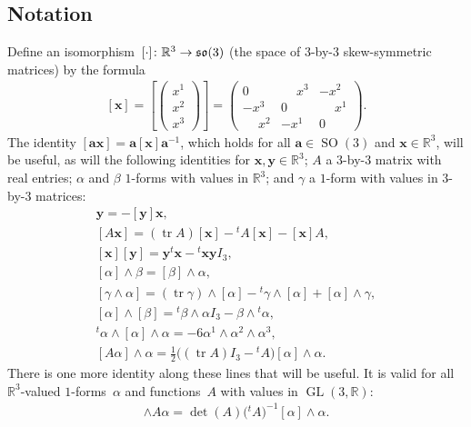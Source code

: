 \documentclass[pdftex]{sigma}
\numberwithin{equation}{section}
\newcommand{\GL}{\operatorname{GL}}
\newcommand{\SO}{\operatorname{SO}}
\newcommand{\euso}{\operatorname{\frak{so}}}
\newcommand{\mba}{\mathbf{a}}
\newcommand{\mbx}{\mathbf{x}}
\newcommand{\mby}{\mathbf{y}}
\DeclareMathOperator{\tr}{tr}
\newcommand{\phm}{\phantom{-}}
\begin{document}
\subsection{Notation}
Define an isomorphism~$[{\cdot}]\colon \mathbb{R}^3\to\euso(3)$
(the space of $3$-by-$3$ skew-symmetric matrices) by the formula
\begin{gather*}%
\left[ \mbx \right]
= \left[\begin{pmatrix}x^1\\x^2\\x^3\end{pmatrix}\right]
= \begin{pmatrix}
 0 & \phm x^3 & -x^2\\
 -x^3 & 0 & \phm x^1\\
 \phm x^2 & -x^1 & 0
 \end{pmatrix}.
\end{gather*}
The identity $[\mba \mbx] = \mba[\mbx]\mba^{-1}$,
which holds for all $\mba\in\SO(3)$ and $\mbx\in\mathbb{R}^3$,
will be useful, as will the following identities
for $\mbx, \mby\in\mathbb{R}^3$;
$A$ a $3$-by-$3$ matrix with real entries;
$\alpha$ and $\beta$ $1$-forms with values in $\mathbb{R}^3$;
and $\gamma$ a $1$-form with values in $3$-by-$3$ matrices:
\begin{gather}
 [\mbx] \mby = - [\mby] \mbx,\nonumber\\
[A\mbx] = (\tr A) [\mbx] - {}^t\!A [\mbx] - [\mbx] A,\nonumber\\
[\mbx][\mby] = \mby {}^t\mbx - {}^t\mbx \mby I_3,\nonumber\\
[\alpha ]\wedge\beta = [\beta]\wedge\alpha,\nonumber\\
[\gamma\wedge\alpha] = (\tr\gamma)\wedge[\alpha]-{}^t\gamma\wedge[\alpha]+[\alpha]\wedge\gamma,\nonumber\\
[\alpha]\wedge [\beta] = {}^t\beta\wedge\alpha I_3 - \beta\wedge {}^t\alpha,\nonumber\\
{}^t\alpha\wedge[\alpha]\wedge\alpha = - 6 \alpha^1\wedge\alpha^2\wedge\alpha^3,\nonumber\\
[A \alpha]\wedge\alpha = \tfrac12\bigl((\tr A) I_3 - {}^t\!A\bigr) [\alpha]\wedge\alpha.\label{eq: crossproductidentities}
\end{gather}
There is one more identity along these lines that will be useful. It is valid for all $\mathbb{R}^3$-valued $1$-forms~$\alpha$ and functions~$A$ with values in $\GL(3,\mathbb{R})$:
\begin{gather*}
[A\alpha]\wedge A\alpha = \det(A) \big({}^t\!A\big)^{-1} [\alpha]\wedge\alpha.
\end{gather*}
\end{document}
